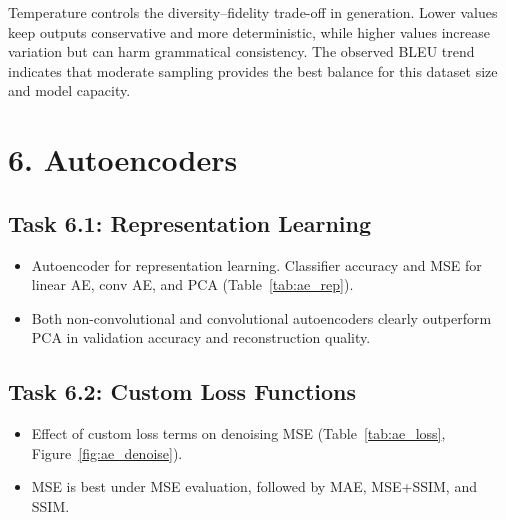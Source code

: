 Temperature controls the diversity--fidelity trade-off in generation. Lower values keep outputs conservative and more deterministic, while higher values increase variation but can harm grammatical consistency. The observed BLEU trend indicates that moderate sampling provides the best balance for this dataset size and model capacity.

\section*{6. Autoencoders}

\subsection*{Task 6.1: Representation Learning}
\begin{itemize}
  \item Autoencoder for representation learning. Classifier accuracy and MSE for linear AE, conv AE, and PCA (Table~\ref{tab:ae_rep}).
  \item Both non-convolutional and convolutional autoencoders clearly outperform PCA in validation accuracy and reconstruction quality.
\end{itemize}

\begin{table}[!ht]
  \centering
  \scriptsize
  \caption{Task 6.1: Representation learning results (train/validation accuracy and reconstruction MSE).}
  \label{tab:ae_rep}
\end{table}

\subsection*{Task 6.2: Custom Loss Functions}
\begin{itemize}
  \item Effect of custom loss terms on denoising MSE (Table~\ref{tab:ae_loss}, Figure~\ref{fig:ae_denoise}).
  \item MSE is best under MSE evaluation, followed by MAE, MSE+SSIM, and SSIM.
\end{itemize}

